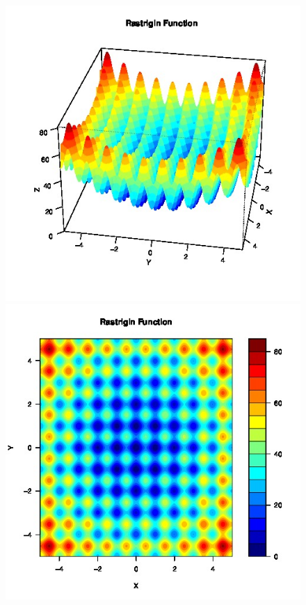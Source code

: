 \documentclass{article}
\begin{document}
\clearpage

\begin{figure}
	\begin{center}
		\begin{minipage}[h!]{0.49\textwidth}
			\includegraphics[width=1.0\textwidth]{rastPersp.jpg}
		\end{minipage}
		\begin{minipage}[h!]{0.49\textwidth}
			\includegraphics[width=1.0\textwidth]{rastContour.jpg}	
		\end{minipage}
	\end{center}
\end{figure}
\end{document}
